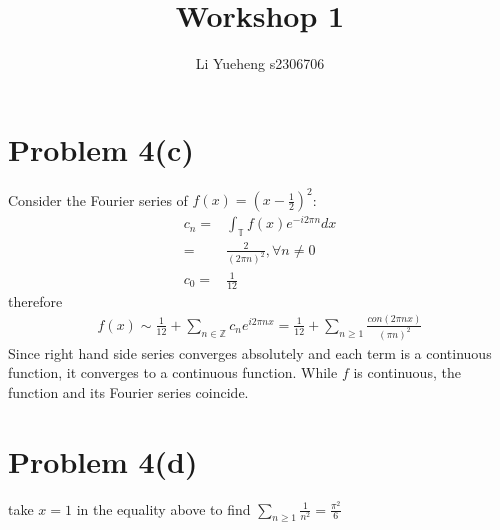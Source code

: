 \documentclass{article}
\begin{document}
\title{Workshop 1}
\author{Li Yueheng s2306706}


\maketitle


\section*{Problem 4(c)}

Consider the Fourier series of $f(x)=(x-\frac{1}{2})^2$:
\begin{align*}
	c_n=&\int_{\mathbb{T}}f(x)e^{-i2\pi n}dx \\
	=&\frac{2}{(2\pi n)^2} ,\forall n\neq 0 \\
	c_0=&\frac{1}{12}
\end{align*}
therefore
\begin{align*}
	f(x)\sim \frac{1}{12}+\sum_{n\in\mathbb{Z}}c_ne^{i2\pi nx}=\frac{1}{12}+\sum_{n\geq 1}\frac{con(2\pi nx)}{(\pi n)^2}
\end{align*}
Since right hand side series converges absolutely and each term is a continuous function, it converges to a continuous function. While $f$ is continuous, the function and its Fourier series coincide.

\section*{Problem 4(d)}
take $x=1$ in the equality above to find $\sum_{n\geq 1}\frac{1}{n^2}=\frac{\pi^2}{6}$
\end{document}
